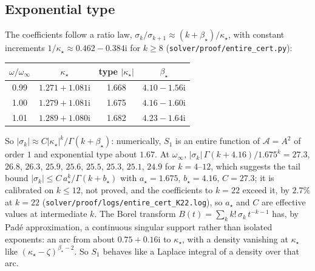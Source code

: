 \documentclass{amsart}
\numberwithin{equation}{section}
\theoremstyle{plain}
\theoremstyle{definition}
\theoremstyle{remark}
\newcommand{\winf}{\omega_\infty}
\newcommand{\iu}{\mathrm{i}}
\newcommand{\repo}[1]{\texttt{#1}}
\begin{document}
\subsection{Exponential type}
The coefficients follow a ratio law, $\sigma_k/\sigma_{k+1} \approx (k + \beta_\star)/\kappa_\star$, with constant increments
$1/\kappa_\star \approx 0.462 - 0.384\iu$ for $k \ge 8$ (\repo{solver/proof/entire\_cert.py}):
\begin{center}\footnotesize
\begin{tabular}{cccc}
\toprule
$\omega/\winf$ & $\kappa_\star$ & type $|\kappa_\star|$ & $\beta_\star$ \\
\midrule
0.99 & $1.271 + 1.081\iu$ & 1.668 & $4.10 - 1.56\iu$ \\
1.00 & $1.279 + 1.081\iu$ & 1.675 & $4.16 - 1.60\iu$ \\
1.01 & $1.289 + 1.080\iu$ & 1.682 & $4.23 - 1.64\iu$ \\
\bottomrule
\end{tabular}
\end{center}
So $|\sigma_k| \approx C|\kappa_\star|^k/\Gamma(k + \beta_\star)$: numerically, $S_1$ is an entire function of $\mathcal A = A^2$ of order $1$ and
exponential type about $1.67$. At $\winf$, $|\sigma_k|\,\Gamma(k + 4.16)/1.675^k = 27.3$, $26.8$, $26.3$, $25.9$, $25.6$, $25.5$, $25.3$,
$25.1$, $24.9$ for $k = 4$--$12$, which suggests the tail bound $|\sigma_k| \le C\,a_\star^k/\Gamma(k + b_\star)$ with $a_\star = 1.675$,
$b_\star = 4.16$, $C = 27.3$; it is calibrated on $k \le 12$, not proved, and the coefficients to $k = 22$ exceed it, by
$2.7\%$ at $k = 22$ (\repo{solver/proof/logs/entire\_cert\_K22.log}), so $a_\star$ and $C$ are effective values at intermediate $k$. The Borel transform $B(t) = \sum_k k!\,\sigma_k\,t^{-k-1}$ has, by
Pad\'e approximation, a continuous singular support rather than isolated exponents: an arc from about $0.75 + 0.16\iu$ to
$\kappa_\star$, with a density vanishing at $\kappa_\star$ like $(\kappa_\star - \zeta)^{\beta_\star - 2}$. So $S_1$ behaves like a Laplace integral of
a density over that arc.
\end{document}
